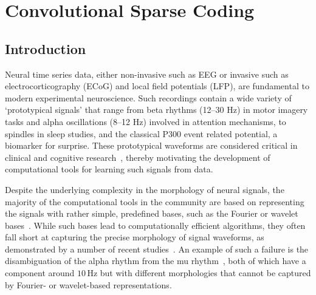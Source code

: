 \chapter{Convolutional Sparse Coding}


\section{Introduction}
Neural time series data, either non-invasive such as \ac{EEG} 
or invasive such as electrocorticography (ECoG) and local field potentials (LFP), are fundamental to modern experimental neuroscience. Such recordings contain a wide variety of `prototypical signals' that range from beta rhythms (12--30 Hz) in motor imagery tasks and alpha oscillations (8--12 Hz) involved in attention mechanisms, to spindles in sleep studies, 
and the classical P300 event related potential, a biomarker for surprise. 
%
These prototypical waveforms are considered critical in clinical and cognitive research~\cite{cole2017brain}, thereby motivating the development of computational tools for learning such signals from data.


Despite the underlying complexity in the morphology of neural signals, the majority of the computational tools in the community are based on representing the signals with rather simple, predefined bases, such as the Fourier or wavelet bases~\cite{cohen2014analyzing}.
While such bases lead to computationally efficient algorithms, they often fall short at capturing the precise morphology of signal waveforms, as demonstrated by a number of recent studies~\cite{jones2016brain,mazaheri2008asymmetric}. An example of such a failure is the disambiguation of the alpha rhythm from the mu rhythm~\cite{hari2017meg}, both of which have a component around $10$\,Hz but with different morphologies that cannot be captured by Fourier- or wavelet-based representations.





